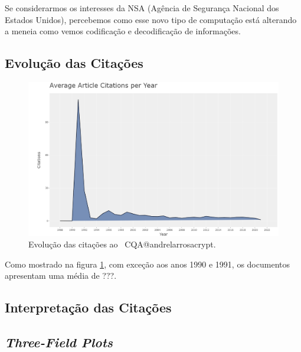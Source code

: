 Se considerarmos os interesses da NSA (Agência de Segurança Nacional dos Estados Unidos), percebemos como esse novo tipo de computação está alterando a meneia como vemos codificação e decodificação de informações. 


\subsection{Evolução das Citações}

\begin{figure}
    \centering
    \includegraphics[width=1\textwidth]{experiments/andrelarrosacrypt/AnaliseBibliometrica/CriptografiaQuantica/imagens/CQA@andrelarrosacrypt_CitaAnual.png}
    \caption{Evolução das citações ao \dataset\ CQA@andrelarrosacrypt.}
    \label{CQA@andrelarrosacrypt_CitaAnual}
\end{figure}


Como mostrado na figura \ref{CQA@andrelarrosacrypt_CitaAnual}, com exceção aos anos 1990 e 1991, os documentos apresentam uma média de ???.


\subsection{Interpretação das Citações}






\subsection{\textit{Three-Field Plots}}

